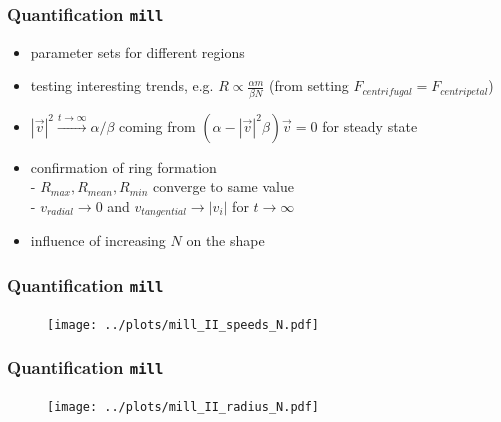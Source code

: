 \documentclass[compress]{beamer}
\begin{document}


\begin{frame}
	\frametitle{Quantification \texttt{mill}}
	\begin{itemize}
		\item parameter sets for different regions
		\item testing interesting trends, e.g. \( R \propto \frac{\alpha m}{\beta N}\) (from setting \( F_{centrifugal} = F_{centripetal} \))
		\item \( |\vec{v}|^{2} \xrightarrow{t \to \infty}  \alpha / \beta \) coming from \( (\alpha - |\vec{v}|^2 \beta ) \vec{v} = 0 \) for steady state
		\item confirmation of ring formation \\
		- \( R_{max}, R_{mean}, R_{min} \) converge to same value \\
		- \( v_{radial} \to 0 \) and \( v_{tangential} \to | v_{i} |  \) for \( t \to \infty \)
		\item influence of increasing \( N \) on the shape
	\end{itemize}
\end{frame}


\begin{frame}
	\frametitle{Quantification \texttt{mill}}
	\begin{figure}[H]
		\texttt{[image: ../plots/mill\_II\_speeds\_N.pdf]}
	\end{figure}	
\end{frame}


\begin{frame}
	\frametitle{Quantification \texttt{mill}}
	
\begin{figure}[H]
		\texttt{[image: ../plots/mill\_II\_radius\_N.pdf]}
\end{figure}

\end{frame}
\end{document}
